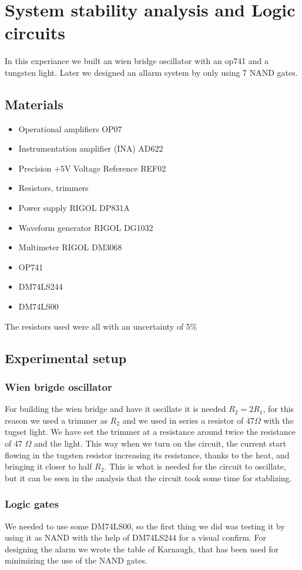 \chapter{System stability analysis and Logic circuits}
In this experiance we built an wien bridge oscillator with an op741 and a tungsten light. Later we designed an allarm system by only using 7 NAND gates.

\section{Materials}
\begin{itemize}
\item Operational amplifiers OP07
\item Instrumentation amplifier (INA) AD622
\item Precision +5V Voltage Reference REF02
\item Resistors, trimmers
\item Power supply RIGOL DP831A
\item Waveform generator RIGOL DG1032
\item Multimeter RIGOL DM3068
\item OP741
\item DM74LS244
\item DM74LS00
\end{itemize}
The resistors used were all with an uncertainty of 5\%

\section{Experimental setup}
\subsection{Wien brigde oscillator}
For building the wien bridge and have it oscillate it is needed $R_2 = 2 R_1$, for this reason we used a trimmer as $R_2$ and we used in series a resistor of $47 \Omega$ with the tugset light. We have  set the trimmer at a resistance around twice the resistance of 47 $\Omega$ and the light. This way when we turn on the circuit, the current start flowing in the tugsten resistor increasing its resistance, thanks to the heat, and bringing it closer to half $R_2$. This is what is needed for the circuit to oscillate, but it can be seen in the analysis that the circuit took some time for stablizing.
\subsection{Logic gates}
We needed to use some DM74LS00, so the first thing we did was testing it by using it as NAND with the help of DM74LS244 for a visual confirm.
For designing the alarm we wrote the table of Karnaugh, that has been used for minimizing the use of the NAND gates.

